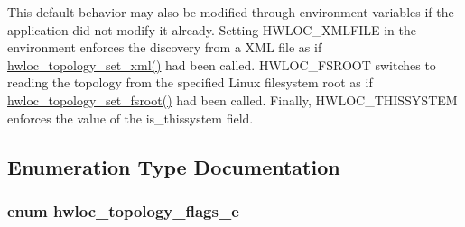 This default behavior may also be modified through environment variables if the application did not modify it already. Setting HWLOC\_\-XMLFILE in the environment enforces the discovery from a XML file as if \hyperlink{group__hwlocality__configuration_ga29b8ebec1b85b324af18fdf5040806bf}{hwloc\_\-topology\_\-set\_\-xml()} had been called. HWLOC\_\-FSROOT switches to reading the topology from the specified Linux filesystem root as if \hyperlink{group__hwlocality__configuration_ga45a6b5dd59be36879a64a7f73e0363c2}{hwloc\_\-topology\_\-set\_\-fsroot()} had been called. Finally, HWLOC\_\-THISSYSTEM enforces the value of the is\_\-thissystem field. 

\subsection{Enumeration Type Documentation}
\hypertarget{group__hwlocality__configuration_gada025d3ec20b4b420f8038d23d6e7bde}{
\subsubsection[{hwloc\_\-topology\_\-flags\_\-e}]{\setlength{\rightskip}{0pt plus 5cm}enum {\bf hwloc\_\-topology\_\-flags\_\-e}}}
\label{group__hwlocality__configuration_gada025d3ec20b4b420f8038d23d6e7bde}


